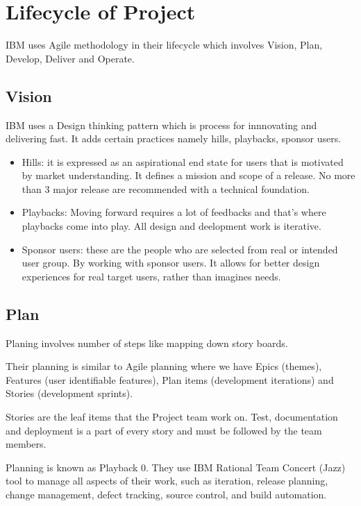 \section{Lifecycle of Project}

IBM uses Agile methodology in their lifecycle which involves Vision, Plan, Develop, Deliver and Operate.

\subsection{Vision}

IBM uses a Design thinking pattern which is process for innnovating and delivering fast. It adds certain practices namely hills, playbacks, sponsor users.

\begin{itemize}
    \item Hills: it is expressed as an aspirational end state for users that is motivated by market understanding. It defines a mission and scope of a release. No more than 3 major release are recommended with a technical foundation.
    \item Playbacks: Moving forward requires a lot of feedbacks and that's where playbacks come into play. All design and deelopment work is iterative.
    \item Sponsor users: these are the people who are selected from real or intended user group. By working with sponsor users. It allows for better design experiences for real target users, rather than imagines needs.
\end{itemize}

\subsection{Plan}

Planing involves number of steps like mapping down story boards.

Their planning is similar to Agile planning where we have Epics (themes), Features (user identifiable features), Plan items (development iterations) and Stories (development sprints).

Stories are the leaf items that the Project team work on. Test, documentation and deployment is a part of every story and must be followed by the team members.

Planning is known as Playback 0. They use IBM Rational Team Concert (Jazz) tool to manage all aspects of their work, such as iteration, release planning, change management, defect tracking, source control, and build automation.


